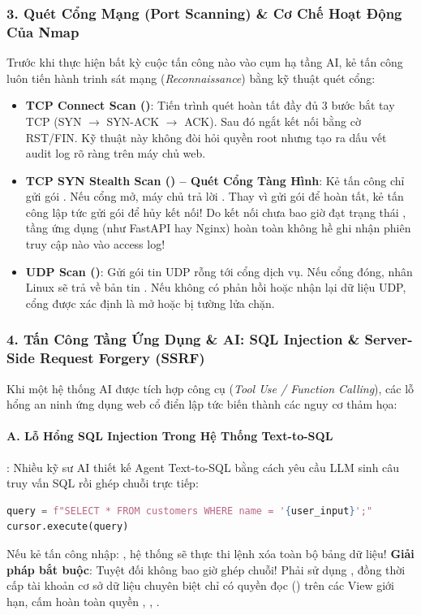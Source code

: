 \subsubsection{3. Quét Cổng Mạng (Port Scanning) \& Cơ Chế Hoạt Động Của Nmap}
Trước khi thực hiện bất kỳ cuộc tấn công nào vào cụm hạ tầng AI, kẻ tấn công luôn tiến hành trinh sát mạng (\textit{Reconnaissance}) bằng kỹ thuật quét cổng:
\begin{itemize}
  \item \textbf{TCP Connect Scan ()}: Tiến trình quét hoàn tất đầy đủ 3 bước bắt tay TCP (SYN $\to$ SYN-ACK $\to$ ACK). Sau đó ngắt kết nối bằng cờ RST/FIN. Kỹ thuật này không đòi hỏi quyền root nhưng tạo ra dấu vết audit log rõ ràng trên máy chủ web.
  \item \textbf{TCP SYN Stealth Scan () -- Quét Cổng Tàng Hình}: Kẻ tấn công chỉ gửi gói . Nếu cổng mở, máy chủ trả lời . Thay vì gửi gói  để hoàn tất, kẻ tấn công lập tức gửi gói  để hủy kết nối! Do kết nối chưa bao giờ đạt trạng thái , tầng ứng dụng (như FastAPI hay Nginx) hoàn toàn không hề ghi nhận phiên truy cập nào vào access log!
  \item \textbf{UDP Scan ()}: Gửi gói tin UDP rỗng tới cổng dịch vụ. Nếu cổng đóng, nhân Linux sẽ trả về bản tin . Nếu không có phản hồi hoặc nhận lại dữ liệu UDP, cổng được xác định là mở hoặc bị tường lửa chặn.
\end{itemize}

\subsubsection{4. Tấn Công Tầng Ứng Dụng \& AI: SQL Injection \& Server-Side Request Forgery (SSRF)}
Khi một hệ thống AI được tích hợp công cụ (\textit{Tool Use / Function Calling}), các lỗ hổng an ninh ứng dụng web cổ điển lập tức biến thành các nguy cơ thảm họa:

\paragraph{A. Lỗ Hổng SQL Injection Trong Hệ Thống Text-to-SQL}:
Nhiều kỹ sư AI thiết kế Agent Text-to-SQL bằng cách yêu cầu LLM sinh câu truy vấn SQL rồi ghép chuỗi trực tiếp:
\begin{lstlisting}[language=Python]
query = f"SELECT * FROM customers WHERE name = '{user_input}';"
cursor.execute(query)
\end{lstlisting}
Nếu kẻ tấn công nhập: , hệ thống sẽ thực thi lệnh xóa toàn bộ bảng dữ liệu! 
\textbf{Giải pháp bắt buộc}: Tuyệt đối không bao giờ ghép chuỗi! Phải sử dụng , đồng thời cấp tài khoản cơ sở dữ liệu chuyên biệt chỉ có quyền đọc () trên các View giới hạn, cấm hoàn toàn quyền , , .

